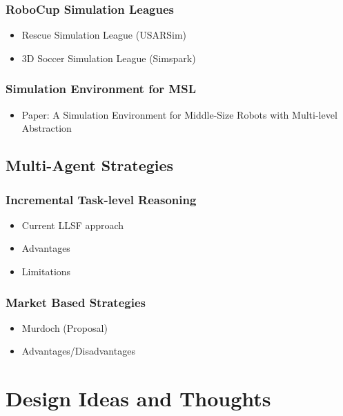 \documentclass[a4paper,11pt]{article}
\begin{document}
\subsubsection{RoboCup Simulation Leagues}
\begin{itemize}
\item Rescue Simulation League (USARSim)
\item 3D Soccer Simulation League (Simspark)
\end{itemize}
\subsubsection{Simulation Environment for MSL}
\begin{itemize}
\item Paper: A Simulation Environment for Middle-Size Robots with Multi-level Abstraction
\end{itemize}
\subsection{Multi-Agent Strategies}
\subsubsection{Incremental Task-level Reasoning}
\begin{itemize}
\item Current LLSF approach
\item Advantages
\item Limitations
\end{itemize}
\subsubsection{Market Based Strategies}
\begin{itemize}
\item Murdoch (Proposal)
\item Advantages/Disadvantages
\end{itemize}


\section{Design Ideas and Thoughts}
\end{document}
